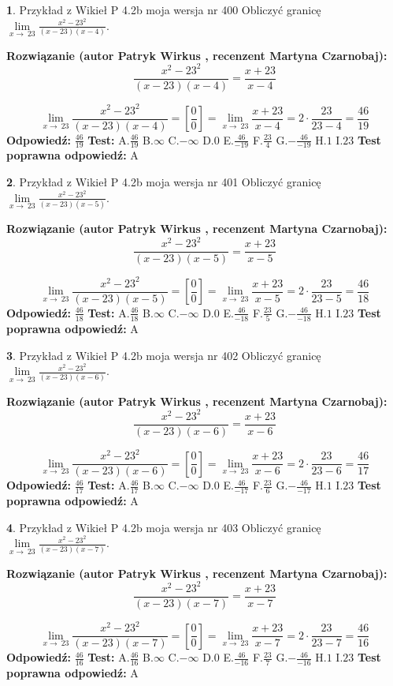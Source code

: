 \documentclass[12pt, a4paper]{article}
\theoremstyle{definition} %
\newtheorem{zad}{}
\newcommand{\zadStart}[1]{\begin{zad}#1\newline}
\newcommand{\zadStop}{\end{zad}}
\newcommand{\rozwStart}[2]{\noindent \textbf{Rozwiązanie (autor #1 , recenzent #2): }\newline}
\newcommand{\rozwStop}{\newline}
\newcommand{\odpStart}{\noindent \textbf{Odpowiedź:}\newline}
\newcommand{\odpStop}{\newline}
\newcommand{\testStart}{\noindent \textbf{Test:}\newline}
\newcommand{\testStop}{\newline}
\newcommand{\kluczStart}{\noindent \textbf{Test poprawna odpowiedź:}\newline}
\newcommand{\kluczStop}{\newline}
\begin{document}
\zadStart{Przykład z Wikieł P 4.2b moja wersja nr 400}
Obliczyć granicę $\lim\limits_{x\to\ 23}\frac{x^{2}-23^{2}}{(x-23)(x-4)}$.
\zadStop
\rozwStart{Patryk Wirkus}{Martyna Czarnobaj}
$$\frac{x^{2}-23^{2}}{(x-23)(x-4)}=\frac{x+23}{x-4}$$

$$\lim\limits_{x\to\ 23}\frac{x^{2}-23^{2}}{(x-23)(x-4)}=[\frac{0}{0}]=\lim\limits_{x\to\ 23}\frac{x+23}{x-4}=2 \cdot \frac{23}{23-4} = \frac{46}{19}$$
\rozwStop
\odpStart
$\frac{46}{19}$
\odpStop
\testStart
A.$\frac{46}{19}$
B.$\infty$
C.$-\infty$
D.$0$
E.$\frac{46}{-19}$
F.$\frac{23}{4}$
G.$-\frac{46}{-19}$
H.$1$
I.$23$
\testStop
\kluczStart
A
\kluczStop



\zadStart{Przykład z Wikieł P 4.2b moja wersja nr 401}
Obliczyć granicę $\lim\limits_{x\to\ 23}\frac{x^{2}-23^{2}}{(x-23)(x-5)}$.
\zadStop
\rozwStart{Patryk Wirkus}{Martyna Czarnobaj}
$$\frac{x^{2}-23^{2}}{(x-23)(x-5)}=\frac{x+23}{x-5}$$

$$\lim\limits_{x\to\ 23}\frac{x^{2}-23^{2}}{(x-23)(x-5)}=[\frac{0}{0}]=\lim\limits_{x\to\ 23}\frac{x+23}{x-5}=2 \cdot \frac{23}{23-5} = \frac{46}{18}$$
\rozwStop
\odpStart
$\frac{46}{18}$
\odpStop
\testStart
A.$\frac{46}{18}$
B.$\infty$
C.$-\infty$
D.$0$
E.$\frac{46}{-18}$
F.$\frac{23}{5}$
G.$-\frac{46}{-18}$
H.$1$
I.$23$
\testStop
\kluczStart
A
\kluczStop



\zadStart{Przykład z Wikieł P 4.2b moja wersja nr 402}
Obliczyć granicę $\lim\limits_{x\to\ 23}\frac{x^{2}-23^{2}}{(x-23)(x-6)}$.
\zadStop
\rozwStart{Patryk Wirkus}{Martyna Czarnobaj}
$$\frac{x^{2}-23^{2}}{(x-23)(x-6)}=\frac{x+23}{x-6}$$

$$\lim\limits_{x\to\ 23}\frac{x^{2}-23^{2}}{(x-23)(x-6)}=[\frac{0}{0}]=\lim\limits_{x\to\ 23}\frac{x+23}{x-6}=2 \cdot \frac{23}{23-6} = \frac{46}{17}$$
\rozwStop
\odpStart
$\frac{46}{17}$
\odpStop
\testStart
A.$\frac{46}{17}$
B.$\infty$
C.$-\infty$
D.$0$
E.$\frac{46}{-17}$
F.$\frac{23}{6}$
G.$-\frac{46}{-17}$
H.$1$
I.$23$
\testStop
\kluczStart
A
\kluczStop



\zadStart{Przykład z Wikieł P 4.2b moja wersja nr 403}
Obliczyć granicę $\lim\limits_{x\to\ 23}\frac{x^{2}-23^{2}}{(x-23)(x-7)}$.
\zadStop
\rozwStart{Patryk Wirkus}{Martyna Czarnobaj}
$$\frac{x^{2}-23^{2}}{(x-23)(x-7)}=\frac{x+23}{x-7}$$

$$\lim\limits_{x\to\ 23}\frac{x^{2}-23^{2}}{(x-23)(x-7)}=[\frac{0}{0}]=\lim\limits_{x\to\ 23}\frac{x+23}{x-7}=2 \cdot \frac{23}{23-7} = \frac{46}{16}$$
\rozwStop
\odpStart
$\frac{46}{16}$
\odpStop
\testStart
A.$\frac{46}{16}$
B.$\infty$
C.$-\infty$
D.$0$
E.$\frac{46}{-16}$
F.$\frac{23}{7}$
G.$-\frac{46}{-16}$
H.$1$
I.$23$
\testStop
\kluczStart
A
\kluczStop
\end{document}
